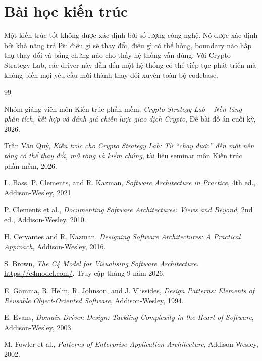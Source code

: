 \documentclass[12pt,a4paper,oneside]{report}
\begin{document}
\section{Bài học kiến trúc}

Một kiến trúc tốt không được xác định bởi số lượng công nghệ. Nó được xác định bởi khả năng trả lời: điều gì sẽ thay đổi, điều gì có thể hỏng, boundary nào hấp thụ thay đổi và bằng chứng nào cho thấy hệ thống vẫn đúng. Với Crypto Strategy Lab, các driver này dẫn đến một hệ thống có thể tiếp tục phát triển mà không biến mọi yêu cầu mới thành thay đổi xuyên toàn bộ codebase.

\clearpage
{}
{}
\begin{thebibliography}{99}

Nhóm giảng viên môn Kiến trúc phần mềm,
\textit{Crypto Strategy Lab -- Nền tảng phân tích, kết hợp và đánh giá chiến lược giao dịch Crypto},
Đề bài đồ án cuối kỳ, 2026.

Trần Văn Quý,
\textit{Kiến trúc cho Crypto Strategy Lab: Từ ``chạy được'' đến một nền tảng có thể thay đổi, mở rộng và kiểm chứng},
tài liệu seminar môn Kiến trúc phần mềm, 2026.

L. Bass, P. Clements, and R. Kazman,
\textit{Software Architecture in Practice}, 4th ed., Addison-Wesley, 2021.

P. Clements et al.,
\textit{Documenting Software Architectures: Views and Beyond}, 2nd ed., Addison-Wesley, 2010.

H. Cervantes and R. Kazman,
\textit{Designing Software Architectures: A Practical Approach}, Addison-Wesley, 2016.

S. Brown,
\textit{The C4 Model for Visualising Software Architecture}.
\url{https://c4model.com/}. Truy cập tháng 9 năm 2026.

E. Gamma, R. Helm, R. Johnson, and J. Vlissides,
\textit{Design Patterns: Elements of Reusable Object-Oriented Software}, Addison-Wesley, 1994.

E. Evans,
\textit{Domain-Driven Design: Tackling Complexity in the Heart of Software}, Addison-Wesley, 2003.

M. Fowler et al.,
\textit{Patterns of Enterprise Application Architecture}, Addison-Wesley, 2002.


\end{thebibliography}
\end{document}
